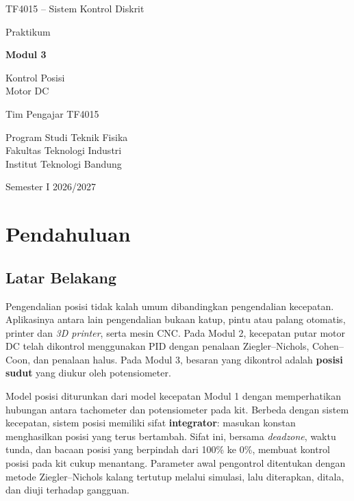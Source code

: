 \documentclass[11pt,a4paper]{article}
\begin{document}
\begin{titlepage}
\centering
\vspace*{2cm}
{\large TF4015 -- Sistem Kontrol Diskrit\par}
\vspace{2.5cm}
{\Large Praktikum\par}
\vspace{0.4cm}
{\huge\bfseries Modul 3\par}
\vspace{0.4cm}
{\LARGE Kontrol Posisi\\Motor DC\par}
\vfill
{\large Tim Pengajar TF4015\par}
\vspace{0.3cm}
{\large Program Studi Teknik Fisika\\Fakultas Teknologi Industri\\Institut Teknologi Bandung\par}
\vspace{0.8cm}
{\large Semester I 2026/2027\par}
\end{titlepage}

\tableofcontents
\newpage
{}
\setcounter{page}{1}

\section{Pendahuluan}
\subsection{Latar Belakang}
Pengendalian posisi tidak kalah umum dibandingkan pengendalian kecepatan. Aplikasinya antara lain pengendalian bukaan katup, pintu atau palang otomatis, printer dan \textit{3D printer}, serta mesin CNC. Pada Modul 2, kecepatan putar motor DC telah dikontrol menggunakan PID dengan penalaan Ziegler--Nichols, Cohen--Coon, dan penalaan halus. Pada Modul 3, besaran yang dikontrol adalah \textbf{posisi sudut} yang diukur oleh potensiometer.

Model posisi diturunkan dari model kecepatan Modul 1 dengan memperhatikan hubungan antara tachometer dan potensiometer pada kit. Berbeda dengan sistem kecepatan, sistem posisi memiliki sifat \textbf{integrator}: masukan konstan menghasilkan posisi yang terus bertambah. Sifat ini, bersama \textit{deadzone}, waktu tunda, dan bacaan posisi yang berpindah dari 100\% ke 0\%, membuat kontrol posisi pada kit cukup menantang. Parameter awal pengontrol ditentukan dengan metode Ziegler--Nichols kalang tertutup melalui simulasi, lalu diterapkan, ditala, dan diuji terhadap gangguan.
\end{document}
